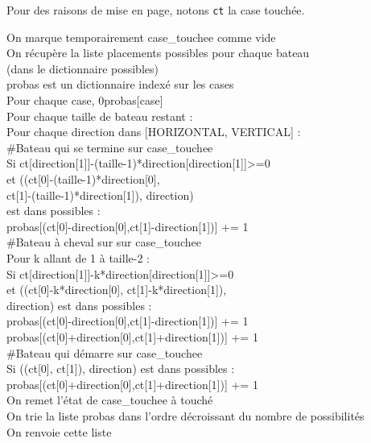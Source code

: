 Pour des raisons de mise en page, notons \texttt{ct} la case touchée.
\begin{algo1}
On marque temporairement case\_touchee comme vide\\ 
On récupère la liste placements possibles pour chaque bateau\\
 (dans le dictionnaire possibles)\\
probas est un dictionnaire indexé sur les cases\\
Pour chaque case, 0\sto probas[case]\\
Pour chaque taille de bateau restant :\\
Pour chaque direction dans [HORIZONTAL, VERTICAL] :\\
\#Bateau qui se termine sur case\_touchee\\
Si ct[direction[1]]-(taille-1)*direction[direction[1]]>=0\\
et ((ct[0]-(taille-1)*direction[0],\\ 
ct[1]-(taille-1)*direction[1]), direction)\\
est dans possibles :\\
probas[(ct[0]-direction[0],ct[1]-direction[1])] += 1\\
\#Bateau à cheval sur sur case\_touchee\\
Pour k allant de 1 à taille-2 :\\
Si ct[direction[1]]-k*direction[direction[1]]>=0\\
et ((ct[0]-k*direction[0], ct[1]-k*direction[1]),\\
 direction) est dans possibles :\\
probas[(ct[0]-direction[0],ct[1]-direction[1])] += 1\\
probas[(ct[0]+direction[0],ct[1]+direction[1])] += 1\\
\#Bateau qui démarre sur case\_touchee\\
Si ((ct[0], ct[1]), direction) est dans possibles :\\
probas[(ct[0]+direction[0],ct[1]+direction[1])] += 1\\
On remet l'état de case\_touchee à touché\\
On trie la liste probas dans l'ordre décroissant du nombre de possibilités\\
On renvoie cette liste\\
\end{algo1}

